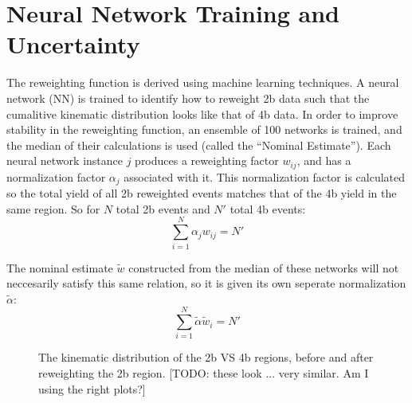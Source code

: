 \section{Neural Network Training and Uncertainty}

    The reweighting function is derived using machine learning techniques.
    A neural network (NN) is trained to identify how to reweight 2b data such that the cumalitive kinematic distribution looks like that of 4b data.
    In order to improve stability in the reweighting function,
        an ensemble of 100 networks is trained, and the median of their calculations is used (called the ``Nominal Estimate'').
    Each neural network instance $j$ produces a reweighting factor $w_{ij}$, and has a normalization factor $\alpha_j$ associated with it.
    This normalization factor is calculated so the total yield of all 2b reweighted events matches that of the 4b yield in the same region.
    So for $N$ total 2b events and $N'$ total 4b events:
        \begin{equation}
        \sum_{i=1}^{N} \alpha_j w_{ij} = N'
        \end{equation}

    The nominal estimate $\tilde{w}$ constructed from the median of these networks will not neccesarily satisfy this same relation,
        so it is given its own seperate normalization $\tilde \alpha$:
        \begin{equation}
        \sum_{i=1}^{N} \tilde \alpha \tilde w_i = N'
        \end{equation}

    \begin{figure}[!htbp]
        \caption{
            The \mhh kinematic distribution of the 2b VS 4b regions, before and after reweighting the 2b region.
            [TODO: these look ... very similar. Am I using the right plots?]
        }
        \label{fig:data_mhh_reweight}
    \end{figure}

